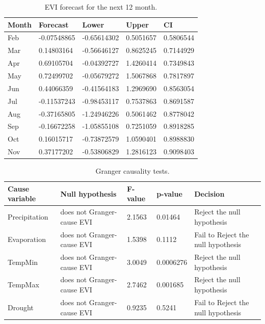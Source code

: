 \begin{table}[]
	\label{table:Prediction}
	\caption{EVI forecast for the next 12 month.}
	\centering
	\addtolength{\tabcolsep}{25pt}
	\begin{tabularx}{\textwidth}{@{}lllll@{}}
		\toprule
   Month       & Forecast& Lower  &   Upper  &CI\\
   \bottomrule
Feb &-0.07548865& -0.65614302& 0.5051657& 0.5806544\\
Mar & 0.14803164& -0.56646127& 0.8625245& 0.7144929\\
Apr & 0.69105704& -0.04392727& 1.4260414& 0.7349843\\
May & 0.72499702& -0.05679272& 1.5067868& 0.7817897\\
Jun & 0.44066359& -0.41564183& 1.2969690& 0.8563054\\
Jul &-0.11537243& -0.98453117& 0.7537863& 0.8691587\\
Aug &-0.37165805& -1.24946226& 0.5061462& 0.8778042\\
Sep &-0.16672258& -1.05855108& 0.7251059& 0.8918285\\
Oct & 0.16015717& -0.73872579& 1.0590401& 0.8988830\\
Nov &  0.37177202& -0.53806829& 1.2816123& 0.9098403\\
		 \bottomrule
\end{tabularx}
\end{table}
\begin{table}[]
	\label{Optimal lag}
	\caption{Granger causality tests.}
	\centering
	
	\addtolength{\tabcolsep}{3pt}
	\begin{tabularx}{\textwidth}{@{}lllll@{}}
	\hline
	Cause variable &Null hypothesis& F-value& p-value& Decision\\
	\hline\hline
Precipitation	& does not Granger-cause EVI &2.1563  & 0.01464  & Reject the null hypothesis  \\
	\hline
Evaporation	& does not Granger-cause EVI & 1.5398 & 0.1112 &Fail to Reject the null hypothesis  \\
	\hline
TempMin	&  does not Granger-cause EVI&3.0049  & 0.0006276 &Reject the null hypothesis  \\
	\hline
TempMax	& does not Granger-cause EVI &2.7462  & 0.001685 &Reject the null hypothesis  \\
	\hline
Drought	& does not Granger-cause EVI & 0.9235 & 0.5241 &Fail to Reject the null hypothesis \\
	\hline
\end{tabularx}
\end{table}
